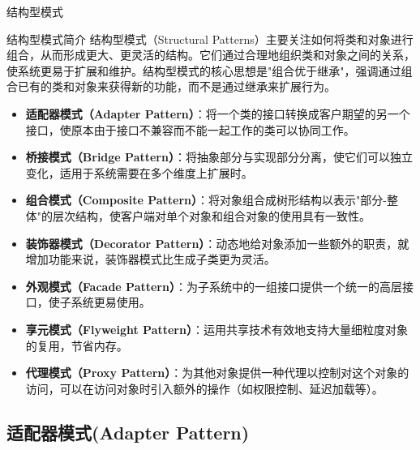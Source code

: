 \documentclass[UTF8,aspectratio=169]{beamer}
\begin{document}
\begin{frame}{结构型模式}
    \begin{ytublock}{结构型模式简介}
        结构型模式（Structural Patterns）主要关注如何将类和对象进行组合，从而形成更大、更灵活的结构。它们通过合理地组织类和对象之间的关系，使系统更易于扩展和维护。结构型模式的核心思想是"组合优于继承"，强调通过组合已有的类和对象来获得新的功能，而不是通过继承来扩展行为。
        {\small
        \begin{itemize}
            \item \textbf{适配器模式（Adapter Pattern）}：将一个类的接口转换成客户期望的另一个接口，使原本由于接口不兼容而不能一起工作的类可以协同工作。
            \item \textbf{桥接模式（Bridge Pattern）}：将抽象部分与实现部分分离，使它们可以独立变化，适用于系统需要在多个维度上扩展时。
            \item \textbf{组合模式（Composite Pattern）}：将对象组合成树形结构以表示"部分-整体"的层次结构，使客户端对单个对象和组合对象的使用具有一致性。
            \item \textbf{装饰器模式（Decorator Pattern）}：动态地给对象添加一些额外的职责，就增加功能来说，装饰器模式比生成子类更为灵活。
            \item \textbf{外观模式（Facade Pattern）}：为子系统中的一组接口提供一个统一的高层接口，使子系统更易使用。
            \item \textbf{享元模式（Flyweight Pattern）}：运用共享技术有效地支持大量细粒度对象的复用，节省内存。
            \item \textbf{代理模式（Proxy Pattern）}：为其他对象提供一种代理以控制对这个对象的访问，可以在访问对象时引入额外的操作（如权限控制、延迟加载等）。
        \end{itemize}
        }
    \end{ytublock}
\end{frame}

\subsection{适配器模式(Adapter Pattern)}
\end{document}

